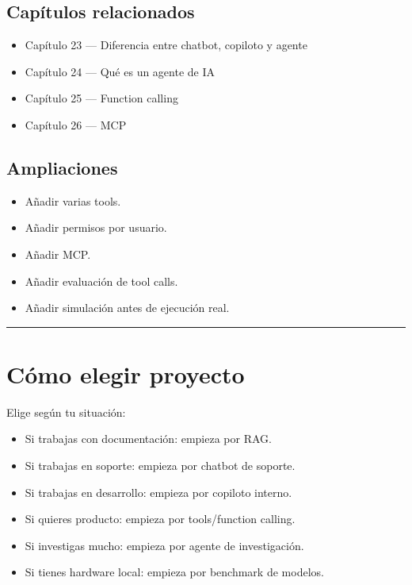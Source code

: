 \subsection{Capítulos relacionados}\label{capuxedtulos-relacionados-4}

\begin{itemize}
\tightlist
\item
  Capítulo 23 --- Diferencia entre chatbot, copiloto y agente
\item
  Capítulo 24 --- Qué es un agente de IA
\item
  Capítulo 25 --- Function calling
\item
  Capítulo 26 --- MCP
\end{itemize}

\subsection{Ampliaciones}\label{ampliaciones-4}

\begin{itemize}
\tightlist
\item
  Añadir varias tools.
\item
  Añadir permisos por usuario.
\item
  Añadir MCP.
\item
  Añadir evaluación de tool calls.
\item
  Añadir simulación antes de ejecución real.
\end{itemize}

\begin{center}\rule{0.5\linewidth}{0.5pt}\end{center}

\section{Cómo elegir proyecto}\label{cuxf3mo-elegir-proyecto}

Elige según tu situación:

\begin{itemize}
\tightlist
\item
  Si trabajas con documentación: empieza por RAG.
\item
  Si trabajas en soporte: empieza por chatbot de soporte.
\item
  Si trabajas en desarrollo: empieza por copiloto interno.
\item
  Si quieres producto: empieza por tools/function calling.
\item
  Si investigas mucho: empieza por agente de investigación.
\item
  Si tienes hardware local: empieza por benchmark de modelos.
\end{itemize}

